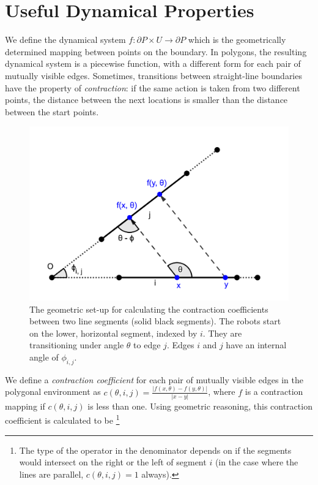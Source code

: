 \documentclass[conference]{IEEEtran}
\begin{document}
\section{Useful Dynamical Properties}

We define the dynamical system $f: \partial P \times U \to \partial P$ which is
the geometrically determined mapping between points on the boundary.
In polygons, the resulting dynamical system is a piecewise function, with a
different form for each pair of mutually visible edges. Sometimes, transitions
between straight-line boundaries have the property of {\em
contraction}: if the same action is taken from two different points, the
distance between the next locations is smaller than the distance between the
start points.

\begin{figure}
    \includegraphics[width=0.8\linewidth]{img/contraction_map_cond.pdf}
    \centering
    \caption[test]{\label{fig:contraction_setup} The geometric set-up for
calculating the contraction coefficients between two line segments (solid black
segments). The robots start on the lower,
horizontal segment, indexed by $i$. They are transitioning under angle $\theta$
to edge $j$. Edges $i$ and $j$ have an internal angle of $\phi_{i,j}$.}
\end{figure}

We define a {\em contraction coefficient} for each pair of mutually visible edges in the
polygonal environment
as $c(\theta, i,j) = \frac{|f(x,\theta) - f(y,\theta)|}{|x-y|}$,
where $f$ is a contraction mapping if $c(\theta, i,j)$
is less than one. Using geometric reasoning, this contraction coefficient is calculated
to be \footnote{The type of the operator in the denominator depends on if the segments
would intersect on the right or the left of segment $i$ (in the case where the lines are parallel, $c(\theta, i,j) = 1$
always).}
\end{document}
